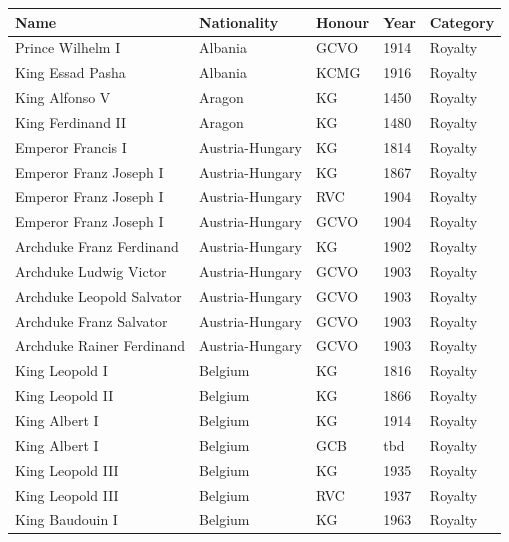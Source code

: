 \documentclass{article}
\begin{document}
\begin{tabular}{lllll}
\toprule
Name & Nationality & Honour & Year & Category \\
\midrule
Prince Wilhelm I & Albania & GCVO & 1914 & Royalty \\
King Essad Pasha & Albania & KCMG & 1916 & Royalty \\
King Alfonso V & Aragon & KG & 1450 & Royalty \\
King Ferdinand II & Aragon & KG & 1480 & Royalty \\
Emperor Francis I & Austria-Hungary & KG & 1814 & Royalty \\
Emperor Franz Joseph I & Austria-Hungary & KG & 1867 & Royalty \\
Emperor Franz Joseph I & Austria-Hungary & RVC & 1904 & Royalty \\
Emperor Franz Joseph I & Austria-Hungary & GCVO & 1904 & Royalty \\
Archduke Franz Ferdinand & Austria-Hungary & KG & 1902 & Royalty \\
Archduke Ludwig Victor & Austria-Hungary & GCVO & 1903 & Royalty \\
Archduke Leopold Salvator & Austria-Hungary & GCVO & 1903 & Royalty \\
Archduke Franz Salvator & Austria-Hungary & GCVO & 1903 & Royalty \\
Archduke Rainer Ferdinand & Austria-Hungary & GCVO & 1903 & Royalty \\
King Leopold I & Belgium & KG & 1816 & Royalty \\
King Leopold II & Belgium & KG & 1866 & Royalty \\
King Albert I & Belgium & KG & 1914 & Royalty \\
King Albert I & Belgium & GCB & tbd & Royalty \\
King Leopold III & Belgium & KG & 1935 & Royalty \\
King Leopold III & Belgium & RVC & 1937 & Royalty \\
King Baudouin I & Belgium & KG & 1963 & Royalty \\
\bottomrule
\end{tabular}
\end{document}
